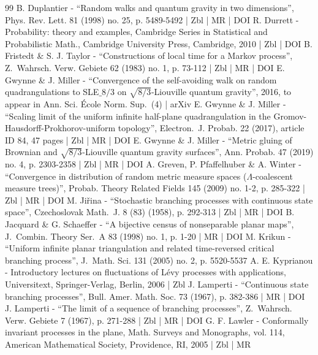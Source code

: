 \begin{thebibliography}{99}
B. Duplantier - “Random walks and quantum gravity in two dimensions”, Phys. Rev. Lett. 81 (1998) no. 25, p. 5489-5492 | Zbl | MR | DOI
R. Durrett - Probability: theory and examples, Cambridge Series in Statistical and Probabilistic Math., Cambridge University Press, Cambridge, 2010 | Zbl | DOI
B. Fristedt \& S. J. Taylor - “Constructions of local time for a Markov process”, Z. Wahrsch. Verw. Gebiete 62 (1983) no. 1, p. 73-112 | Zbl | MR | DOI
E. Gwynne \& J. Miller - “Convergence of the self-avoiding walk on random quadrangulations to SLE$\_{8/3}$ on $\sqrt{8/3}$-Liouville quantum gravity”, 2016, to appear in Ann. Sci. École Norm. Sup. (4) | arXiv
E. Gwynne \& J. Miller - “Scaling limit of the uniform infinite half-plane quadrangulation in the Gromov-Hausdorff-Prokhorov-uniform topology”, Electron. J. Probab. 22 (2017), article ID 84, 47 pages | Zbl | MR | DOI
E. Gwynne \& J. Miller - “Metric gluing of Brownian and $\sqrt{8/3}$-Liouville quantum gravity surfaces”, Ann. Probab. 47 (2019) no. 4, p. 2303-2358 | Zbl | MR | DOI
A. Greven, P. Pfaffelhuber \& A. Winter - “Convergence in distribution of random metric measure spaces ($\Lambda $-coalescent measure trees)”, Probab. Theory Related Fields 145 (2009) no. 1-2, p. 285-322 | Zbl | MR | DOI
M. Jiřina - “Stochastic branching processes with continuous state space”, Czechoslovak Math. J. 8 (83) (1958), p. 292-313 | Zbl | MR | DOI
B. Jacquard \& G. Schaeffer - “A bijective census of nonseparable planar maps”, J. Combin. Theory Ser. A 83 (1998) no. 1, p. 1-20 | MR | DOI
M. Krikun - “Uniform infinite planar triangulation and related time-reversed critical branching process”, J. Math. Sci. 131 (2005) no. 2, p. 5520-5537
A. E. Kyprianou - Introductory lectures on fluctuations of Lévy processes with applications, Universitext, Springer-Verlag, Berlin, 2006 | Zbl
J. Lamperti - “Continuous state branching processes”, Bull. Amer. Math. Soc. 73 (1967), p. 382-386 | MR | DOI
J. Lamperti - “The limit of a sequence of branching processes”, Z. Wahrsch. Verw. Gebiete 7 (1967), p. 271-288 | Zbl | MR | DOI
G. F. Lawler - Conformally invariant processes in the plane, Math. Surveys and Monographs, vol. 114, American Mathematical Society, Providence, RI, 2005 | Zbl | MR

\end{thebibliography}
